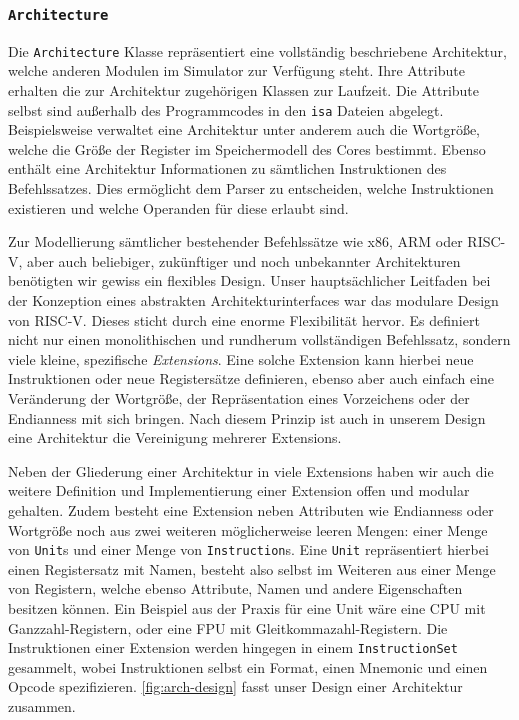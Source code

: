 
\subsubsection{\texttt{Architecture}}

Die \texttt{Architecture} Klasse repräsentiert eine vollständig beschriebene
Architektur, welche anderen Modulen im Simulator zur Verfügung steht. Ihre
Attribute erhalten die zur Architektur zugehörigen Klassen zur Laufzeit. Die Attribute selbst sind
außerhalb des Programmcodes in den \texttt{isa} Dateien abgelegt.
Beispielsweise verwaltet eine Architektur unter anderem auch die Wortgröße,
 welche die Größe der Register im Speichermodell des Cores
bestimmt. Ebenso enthält eine Architektur Informationen zu sämtlichen
Instruktionen des Befehlssatzes. Dies ermöglicht dem Parser zu entscheiden, welche
Instruktionen existieren und welche Operanden für diese erlaubt sind.

Zur Modellierung sämtlicher bestehender Befehlssätze wie x86, ARM oder RISC-V,
aber auch beliebiger, zukünftiger und noch unbekannter Architekturen benötigten
wir gewiss ein flexibles Design. Unser hauptsächlicher Leitfaden bei der
Konzeption eines abstrakten Architekturinterfaces war das modulare Design von
RISC-V. Dieses sticht durch eine enorme Flexibilität hervor. Es definiert nicht
nur einen monolithischen und rundherum vollständigen Befehlssatz, sondern viele
kleine, spezifische \emph{Extensions}. Eine solche Extension kann hierbei neue
Instruktionen oder neue Registersätze definieren, ebenso aber auch einfach eine
Veränderung der Wortgröße, der Repräsentation eines Vorzeichens oder der
Endianness mit sich bringen. Nach diesem Prinzip ist auch in unserem Design eine
Architektur die Vereinigung mehrerer Extensions.

Neben der Gliederung einer Architektur in viele Extensions haben wir auch die
weitere Definition und Implementierung einer Extension offen und modular
gehalten. Zudem besteht eine Extension neben Attributen wie Endianness oder
Wortgröße noch aus zwei weiteren möglicherweise leeren Mengen: einer Menge von
\texttt{Unit}s und einer Menge von \texttt{Instruction}s. Eine \texttt{Unit}
repräsentiert hierbei einen Registersatz mit Namen, besteht also selbst im
Weiteren aus einer Menge von Registern, welche ebenso Attribute, Namen und
andere Eigenschaften besitzen können. Ein Beispiel aus der Praxis für eine Unit wäre eine CPU
mit Ganzzahl-Registern, oder eine FPU mit Gleitkommazahl-Registern.
Die Instruktionen einer Extension werden hingegen in einem
\texttt{InstructionSet} gesammelt, wobei Instruktionen selbst ein Format, einen
Mnemonic und einen Opcode spezifizieren. \autoref{fig:arch-design} fasst unser
Design einer Architektur zusammen.

